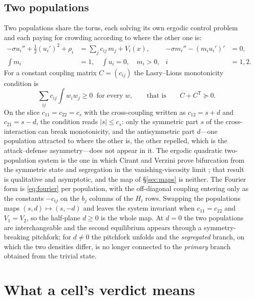 \documentclass[11pt]{article}
\theoremstyle{definition}
\begin{document}
\subsection{Two populations}

Two populations share the torus, each solving its own ergodic control problem and each paying for crowding according to where the other one is:
\begin{equation}\label{eq:mfg2}
\begin{aligned}
-\sigma u_i'' + \tfrac12 (u_i')^2 + \rho_i &= \sum_{j} c_{ij}\,m_j + V_i(x), & -\sigma m_i'' - (m_i u_i')' &= 0,\\
\int m_i &= 1,\quad \int u_i=0,\quad m_i>0, & i&=1,2.
\end{aligned}
\end{equation}
For a constant coupling matrix $C=(c_{ij})$ the Lasry--Lions monotonicity condition \cite{LL07,Ci15} is
\[\textstyle\sum_{ij}c_{ij}\int w_iw_j\ge0\ \text{ for every } w,\qquad\text{that is}\qquad C+C^{\mathsf T}\succeq0 .\]
On the slice $c_{11}=c_{22}=c_s$ with the cross-coupling written as $c_{12}=s+d$ and $c_{21}=s-d$, the condition reads $|s|\le c_s$: only the symmetric part $s$ of the cross-interaction can break monotonicity, and the antisymmetric part $d$---one population attracted to where the other is, the other repelled, which is the attack--defense asymmetry---does not appear in it. The ergodic quadratic two-population system is the one in which Cirant and Verzini prove bifurcation from the symmetric state and segregation in the vanishing-viscosity limit \cite{CV17}; that result is qualitative and asymptotic, and the map of \S\ref{sec:maps} is neither. The Fourier form is \eqref{eq:fourier} per population, with the off-diagonal coupling entering only as the constants $-c_{ij}$ on the $b_j$ columns of the $H_i$ rows. Swapping the populations maps $(s,d)\mapsto(s,-d)$ and leaves the system invariant when $c_{11}=c_{22}$ and $V_1=V_2$, so the half-plane $d\ge0$ is the whole map. At $d=0$ the two populations are interchangeable and the second equilibrium appears through a symmetry-breaking pitchfork; for $d\ne0$ the pitchfork unfolds and the \emph{segregated} branch, on which the two densities differ, is no longer connected to the \emph{primary} branch obtained from the trivial state.

\section{What a cell's verdict means}\label{sec:verdict}
\end{document}
